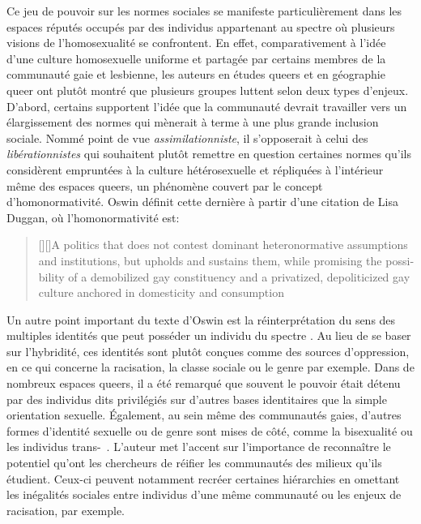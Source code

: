 Ce jeu de pouvoir sur les normes sociales se manifeste particulièrement dans les espaces réputés occupés par des individus appartenant au spectre \lgbt{} où plusieurs visions de l'homosexualité se confrontent.
En effet, comparativement à l'idée d'une culture homosexuelle uniforme et partagée par certains membres de la communauté gaie et lesbienne, les auteurs en études queers et en géographie queer ont plutôt montré que plusieurs groupes luttent selon deux types d'enjeux.
D'abord, certains supportent l'idée que la communauté devrait travailler vers un élargissement des normes qui mènerait à terme à une plus grande inclusion sociale.
Nommé point de vue \emph{assimilationniste}, il s'opposerait à celui des \emph{libérationnistes} qui souhaitent plutôt remettre en question certaines normes qu'ils considèrent empruntées à la culture hétérosexuelle et répliquées à l'intérieur même des espaces queers, un phénomène couvert par le concept d'homonormativité.
Oswin définit cette dernière à partir d'une citation de Lisa Duggan, où l'homonormativité est:
\foreignblockquote{english}[{\cite[tel que cité dans][92]{Oswin2008}}][]{[{\cite[50]{Duggan2003}}][]{A politics that does not contest dominant heteronormative assumptions and institutions, but upholds and sustains them, while promising the possibility of a demobilized gay constituency and a privatized, depoliticized gay culture anchored in domesticity and consumption}}.

Un autre point important du texte d'Oswin est la réinterprétation du sens des multiples identités que peut posséder un individu du spectre \lgbt{}.
Au lieu de se baser sur l'hybridité, ces identités sont plutôt conçues comme des sources d'oppression, en ce qui concerne la racisation, la classe sociale ou le genre par exemple.
Dans de nombreux espaces queers, il a été remarqué que souvent le pouvoir était détenu par des individus dits privilégiés sur d'autres bases identitaires que la simple orientation sexuelle.
Également, au sein même des communautés gaies, d'autres formes d'identité sexuelle ou de genre sont mises de côté, comme la bisexualité ou les individus trans-~\citep[93]{Oswin2008}.
L'auteur met l'accent sur l'importance de reconnaître le potentiel qu'ont les chercheurs de réifier les communautés des milieux qu'ils étudient. Ceux-ci peuvent notamment recréer certaines hiérarchies en omettant les inégalités sociales entre individus d'une même communauté ou les enjeux de racisation, par exemple.

